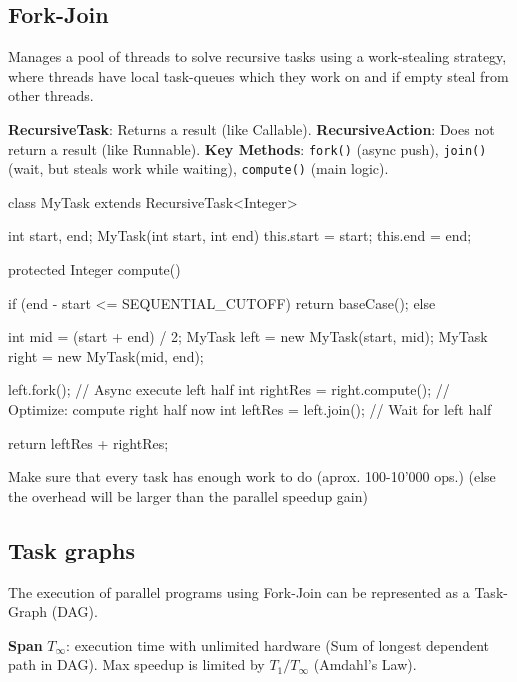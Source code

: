 \subsection{Fork-Join}

Manages a pool of threads to solve recursive tasks using a work-stealing strategy, where threads have local task-queues
which they work on and if empty steal from other threads.

\begin{definition}
\textbf{RecursiveTask}: Returns a result (like Callable).
\textbf{RecursiveAction}: Does not return a result (like Runnable).
\textbf{Key Methods}: \texttt{fork()} (async push), \texttt{join()} (wait, but steals work while waiting), \texttt{compute()} (main logic).
\end{definition}

\begin{codeexample}
class MyTask extends RecursiveTask<Integer> {
    int start, end;
    MyTask(int start, int end) { this.start = start; this.end = end; }
    
    protected Integer compute() {
        if (end - start <= SEQUENTIAL_CUTOFF) { 
            return baseCase(); 
        } else {
            int mid = (start + end) / 2;
            MyTask left = new MyTask(start, mid);
            MyTask right = new MyTask(mid, end);
            
            left.fork(); // Async execute left half
            int rightRes = right.compute(); // Optimize: compute right half now
            int leftRes = left.join();      // Wait for left half
            
            return leftRes + rightRes;
        } 
    }
}
\end{codeexample}

\begin{important}

Make sure that every task has enough work to do (aprox. 100-10'000 ops.) (else the overhead will be larger than the parallel speedup gain)
            
\end{important}

\subsection{Task graphs}

The execution of parallel programs using Fork-Join can be represented as a Task-Graph (DAG).

\begin{definition}
\textbf{Span} $T_{\infty}$: execution time with unlimited hardware (Sum of longest dependent path in DAG).
Max speedup is limited by $T_1 / T_{\infty}$ (Amdahl's Law).
\end{definition}

        